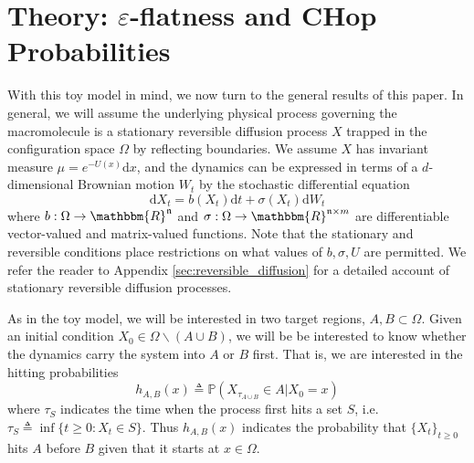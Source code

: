\documentclass[english, aip, jcp, priprint, graphicx,floatfix]{revtex4-1}
\theoremstyle{plain}
\theoremstyle{definition}
\theoremstyle{plain}
\newcommand{\dimension}{{\mathfrak{n}}}
\begin{document}
\section{Theory: $\varepsilon$-flatness and CHop Probabilities}\label{sec:model_formulation}

With this toy model in mind, we now turn to the general results of this paper. In general, we will assume the underlying physical process governing the macromolecule is a stationary reversible diffusion process $X$ trapped in the configuration space $\Omega$ by reflecting boundaries.  We assume $X$ has invariant
measure ${\mu}= e^{- U (x)} \mathrm{d} x$, and the dynamics can be expressed in terms of a $d$-dimensional Brownian motion $W_t$ by the stochastic differential equation
\begin{equation}\label{equ:general_sde}\mathrm{d} X_t = b (X_t) \mathrm{d} t + \sigma (X_t) \mathrm{d} W_t \end{equation}
where $b: \Omega \rightarrow \mathbbm{R}^\dimension$ and $\sigma :
\Omega \rightarrow \mathbbm{R}^{\dimension \times m}$ are differentiable vector-valued
and matrix-valued functions.  Note that the stationary and reversible conditions place restrictions on what values of $b,\sigma,U$ are permitted.  We refer the reader to Appendix \ref{sec:reversible_diffusion} for a detailed account of stationary reversible diffusion processes.

As in the toy model, we will be interested in two target regions, $A,B\subset \Omega$.  Given an initial condition $X_0\in \Omega \backslash (A\cup B)$, we will be be interested to know whether the dynamics carry the system into $A$ or $B$ first.  That is, we are interested in the hitting probabilities
\[ h_{A, B}(x) \triangleq \mathbb{P}(X_{\tau_{A\cup B}}\in A|X_0=x)\]
where $\tau_S$ indicates the time when the process first hits a set $S$, i.e. $\tau_S \triangleq \inf \{ t \geqslant 0 : X_t \in S \}$.  Thus $h_{A,B}(x)$ indicates the probability that $\{X_t\}_{t \geq 0}$ hits $A$ before $B$ given that it starts at $x\in\Omega$. 
\end{document}
